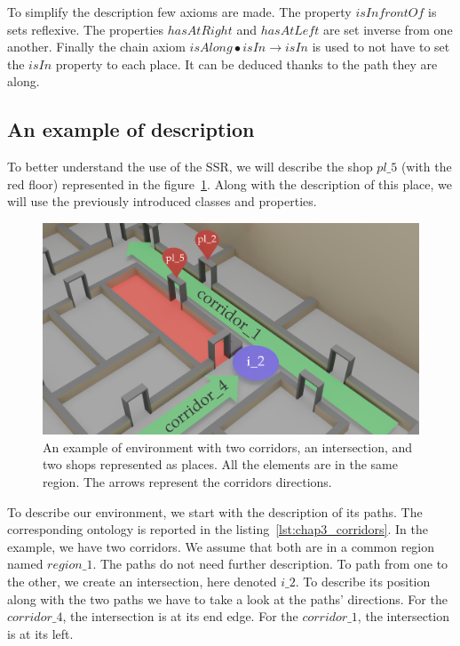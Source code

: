 To simplify the description few axioms are made. The property $isInfrontOf$ is sets reflexive. The properties $hasAtRight$ and $hasAtLeft$ are set inverse from one another. Finally the chain axiom $isAlong \bullet isIn \rightarrow isIn$ is used to not have to set the $isIn$ property to each place. It can be deduced thanks to the path they are along.

\subsection{An example of description}

To better understand the use of the SSR, we will describe the shop $pl\_5$ (with the red floor) represented in the figure~\ref{fig:chap3_example}. Along with the description of this place, we will use the previously introduced classes and properties.

\begin{figure}[ht!]
\centering
\includegraphics[scale=0.16]{figures/chapter3/SSR_example.png}
\caption{\label{fig:chap3_example} An example of environment with two corridors, an intersection, and two shops represented as places. All the elements are in the same region. The arrows represent the corridors directions.}
\end{figure}

To describe our environment, we start with the description of its paths. The corresponding ontology is reported in the listing~\ref{lst:chap3_corridors}. In the example, we have two corridors. We assume that both are in a common region named $region\_1$. The paths do not need further description. To path from one to the other, we create an intersection, here denoted $i\_2$. To describe its position along with the two paths we have to take a look at the paths' directions. For the $corridor\_4$, the intersection is at its end edge. For the $corridor\_1$, the intersection is at its left.

